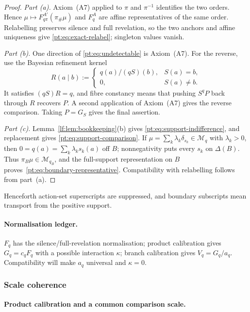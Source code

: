 \documentclass[11pt,a4paper]{article}
\theoremstyle{definition}
\newcommand{\1}{\mathbf 1}
\begin{document}
\begin{proof}
\emph{Part (a).}
Axiom~\textup{(A7)} applied to $\pi$ and $\pi^{-1}$ identifies the two
orders.  Hence $\mu\mapsto F_{q\pi}^{A'}(\pi_\#\mu)$ and $F_q^A$ are affine
representatives of the same order.  Relabelling preserves silence and full
revelation, so the two anchors and affine uniqueness give
\eqref{pt:eq:exact-relabel}; singleton values vanish.

\emph{Part (b).}
One direction of \eqref{pt:eq:undetectable} is Axiom~\textup{(A7)}.  For the
reverse, use the Bayesian refinement kernel
\[
 R(a\mid b):=
 \begin{cases}
 q(a)/(qS)(b),&S(a)=b,\\
 0,&S(a)\ne b.
 \end{cases}
\]
It satisfies $(qS)R=q$, and fibre constancy means that pushing $S^qP$ back
through $R$ recovers $P$.  A second application of Axiom~\textup{(A7)} gives
the reverse comparison.  Taking $P=G_S$ gives the final assertion.

\emph{Part (c).}
Lemma~\ref{lf:lem:bookkeeping}\textup{(b)} gives
\eqref{pt:eq:support-indifference}, and replacement gives
\eqref{pt:eq:support-comparison}.  If
$\mu=\sum_k\lambda_k\delta_{s_k}\in\mathcal M_q$ with $\lambda_k>0$, then
$0=q(a)=\sum_k\lambda_ks_k(a)$ off $B$; nonnegativity puts every $s_k$ on
$\Delta(B)$.  Thus $\pi_B\mu\in\mathcal M_{q_B}$, and the full-support
representation on $B$ proves~\eqref{pt:eq:boundary-representative}.
Compatibility with relabelling follows from part~\textup{(a)}.
\end{proof}

Henceforth action-set superscripts are suppressed, and boundary subscripts
mean transport from the positive support.

\paragraph{Normalisation ledger.}
$F_q$ has the silence/full-revelation normalisation; product calibration gives
$G_q=c_qF_q$ with a possible interaction $\kappa$; branch calibration gives
$V_q=G_q/a_q$.  Compatibility will make $a_q$ universal and $\kappa=0$.

\subsubsection{Scale coherence}

\paragraph{Product calibration and a common comparison scale.}
\end{document}
